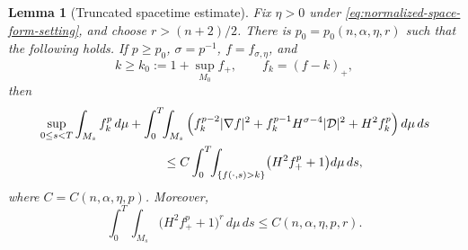 \documentclass[11pt,reqno]{amsart}
\newtheorem{lemma}[proposition]{Lemma}
\theoremstyle{definition}
\theoremstyle{remark}
\numberwithin{equation}{section}
\begin{document}
\begin{lemma}[Truncated spacetime estimate]\label{lem:truncated-energy}
Fix $\eta>0$ under \eqref{eq:normalized-space-form-setting}, and choose $ r>{(n+2)}/{2}$.  
There is $p_0=p_0(n,\alpha,\eta,r)$ such that the following holds.  If
$p\geq p_0$, $\sigma=p^{-1}$, $f=f_{\sigma,\eta}$, and
\begin{equation*}
 k\geq k_0:=1+\sup_{M_0}f_+,
 \qquad f_k=(f-k)_+,
\end{equation*}
then
\begin{align}
 &\sup_{0\leq s<T}\int_{M_s}f_k^p\,d\mu
 +\int_0^T\!\!\int_{M_s}
   \left(f_k^{p-2}|\nabla f|^2
   +f_k^{p-1}H^{\sigma-4}|\mathcal D|^2
   +H^2f_k^p\right)d\mu\,ds\notag\\
 &\hspace{35mm}\leq
 C\int_0^T\!\!\int_{\{f(\cdot,s)>k\}}
   \bigl(H^2f_+^p+1\bigr)d\mu\,ds,
 \label{eq:truncated-energy}
\end{align}
where $C=C(n,\alpha,\eta,p)$.  Moreover,
\begin{equation}\label{eq:weighted-integrability}
 \int_0^T\!\!\int_{M_s}\bigl(H^2f_+^p+1\bigr)^r\,d\mu\,ds
 \leq C(n,\alpha,\eta,p,r).
\end{equation}
\end{lemma}
\end{document}
